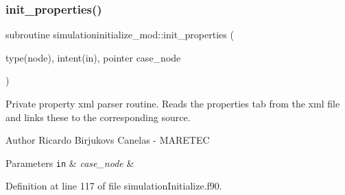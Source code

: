 \subsubsection{\texorpdfstring{init\+\_\+properties()}{init\_properties()}}
{\footnotesize\ttfamily subroutine simulationinitialize\+\_\+mod\+::init\+\_\+properties (\begin{DoxyParamCaption}\item[{type(node), intent(in), pointer}]{case\+\_\+node }\end{DoxyParamCaption})\hspace{0.3cm}{\ttfamily [private]}}



Private property xml parser routine. Reads the properties tab from the xml file and links these to the corresponding source. 

\begin{DoxyAuthor}{Author}
Ricardo Birjukovs Canelas -\/ M\+A\+R\+E\+T\+EC 
\end{DoxyAuthor}

\begin{DoxyParams}[1]{Parameters}
\mbox{\tt in}  & {\em case\+\_\+node} & \\
\hline
\end{DoxyParams}


Definition at line 117 of file simulation\+Initialize.\+f90.


